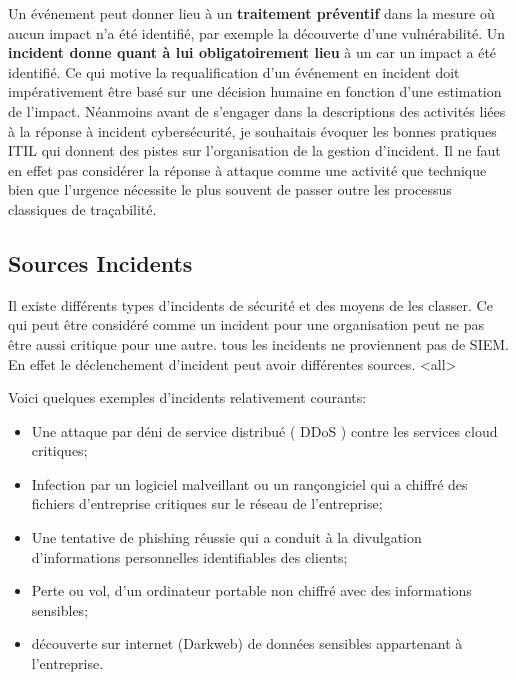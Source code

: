Un événement peut donner lieu à un \textbf{traitement préventif} dans la mesure où aucun impact n'a été identifié, par exemple la découverte d’une vulnérabilité.
Un \textbf{incident donne quant à lui obligatoirement lieu} à un car un impact a été identifié.
Ce qui motive la requalification d’un événement en incident doit impérativement être basé sur une décision humaine en fonction d'une estimation de l'impact.
Néanmoins avant de s'engager dans la descriptions des activités liées à la réponse à incident cybersécurité, je souhaitais évoquer les bonnes pratiques ITIL qui donnent des pistes sur l'organisation de la gestion d'incident. Il ne faut en effet pas considérer la réponse à attaque comme une activité que technique bien que l'urgence nécessite le plus souvent de passer outre les processus classiques de traçabilité.


\subsection{Sources Incidents}

Il existe différents types d'incidents de sécurité et des moyens de les classer. Ce qui peut être considéré comme un incident pour une organisation peut ne pas être aussi critique pour une autre. tous les incidents ne proviennent pas de SIEM. En effet le déclenchement d'incident peut avoir différentes sources.
\mode<all>{}


Voici quelques exemples d'incidents relativement courants:

\begin{itemize}
  \item Une attaque par déni de service distribué ( DDoS ) contre les services cloud critiques;
  \item  Infection par un logiciel malveillant ou un rançongiciel qui a chiffré des fichiers d'entreprise critiques sur le réseau de l'entreprise;
  \item Une tentative de phishing réussie qui a conduit à la divulgation d'informations personnelles identifiables des clients;
  \item Perte ou vol, d'un ordinateur portable non chiffré avec des informations sensibles;
  \item découverte sur internet (Darkweb) de données sensibles appartenant à l'entreprise.
\end{itemize}



